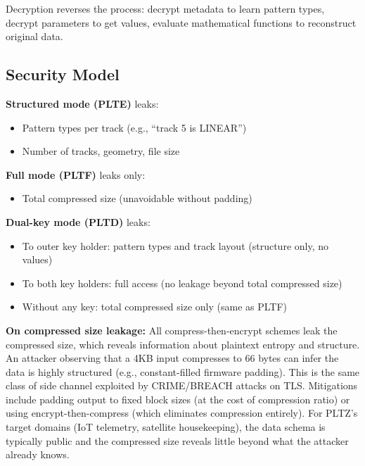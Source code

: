 \documentclass[11pt,a4paper]{article}
\begin{document}
Decryption reverses the process: decrypt metadata to learn pattern types, decrypt parameters to get values, evaluate mathematical functions to reconstruct original data.

\subsection{Security Model}

\textbf{Structured mode (PLTE)} leaks:
\begin{itemize}
\item Pattern types per track (e.g., ``track 5 is LINEAR'')
\item Number of tracks, geometry, file size
\end{itemize}

\textbf{Full mode (PLTF)} leaks only:
\begin{itemize}
\item Total compressed size (unavoidable without padding)
\end{itemize}

\textbf{Dual-key mode (PLTD)} leaks:
\begin{itemize}
\item To outer key holder: pattern types and track layout (structure only, no values)
\item To both key holders: full access (no leakage beyond total compressed size)
\item Without any key: total compressed size only (same as PLTF)
\end{itemize}

\textbf{On compressed size leakage:} All compress-then-encrypt schemes leak the compressed size, which reveals information about plaintext entropy and structure. An attacker observing that a 4KB input compresses to 66 bytes can infer the data is highly structured (e.g., constant-filled firmware padding). This is the same class of side channel exploited by CRIME/BREACH attacks on TLS. Mitigations include padding output to fixed block sizes (at the cost of compression ratio) or using encrypt-then-compress (which eliminates compression entirely). For PLTZ's target domains (IoT telemetry, satellite housekeeping), the data schema is typically public and the compressed size reveals little beyond what the attacker already knows.

\begin{center}
\end{center}
\end{document}
